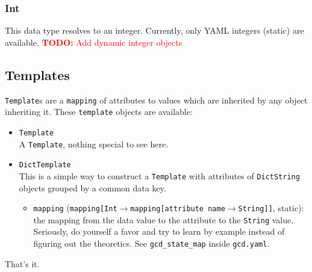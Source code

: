 \documentclass[11pt]{article}
\newcommand{\todo}[1]{\textcolor{red}{\textbf{TODO:} #1}}
\begin{document}
\subsubsection {Int}
This data type resolves to an integer. Currently, only YAML integers (static) are available.
\todo{Add dynamic integer objects}

\subsection {Templates}
\texttt{Template}s are a \texttt{mapping} of attributes to values which are inherited by any object inheriting it. These \texttt{template} objects are available:
\begin{itemize}
  \item \texttt{Template} \\
  A \texttt{Template}, nothing special to see here.
  \item \texttt{DictTemplate} \\
  This is a simple way to construct a \texttt{Template} with attributes of \texttt{DictString} objects grouped by a common data key.
  \begin{itemize}
    \item \texttt{mapping} (\texttt{mapping[Int$\rightarrow$mapping[attribute name$\rightarrow$String]]}, static): the mapping from the data value to the attribute to the \texttt{String} value. Seriously, do yourself a favor and try to learn by example instead of figuring out the theoretics. See \texttt{gcd\_state\_map} inside \texttt{gcd.yaml}.
  \end{itemize}
\end{itemize}

That's it.
\end{document}
